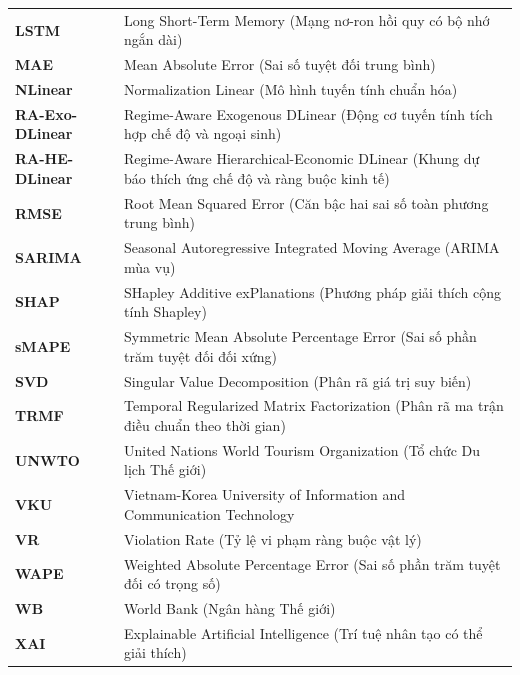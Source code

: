 \documentclass[12pt,a4paper,oneside]{report}
\begin{document}
\begin{longtable}{p{3.0cm} p{11.5cm}}
\textbf{LSTM} & Long Short-Term Memory (Mạng nơ-ron hồi quy có bộ nhớ ngắn dài) \\
\textbf{MAE} & Mean Absolute Error (Sai số tuyệt đối trung bình) \\
\textbf{NLinear} & Normalization Linear (Mô hình tuyến tính chuẩn hóa) \\
\textbf{RA-Exo-DLinear} & Regime-Aware Exogenous DLinear (Động cơ tuyến tính tích hợp chế độ và ngoại sinh) \\
\textbf{RA-HE-DLinear} & Regime-Aware Hierarchical-Economic DLinear (Khung dự báo thích ứng chế độ và ràng buộc kinh tế) \\
\textbf{RMSE} & Root Mean Squared Error (Căn bậc hai sai số toàn phương trung bình) \\
\textbf{SARIMA} & Seasonal Autoregressive Integrated Moving Average (ARIMA mùa vụ) \\
\textbf{SHAP} & SHapley Additive exPlanations (Phương pháp giải thích cộng tính Shapley) \\
\textbf{sMAPE} & Symmetric Mean Absolute Percentage Error (Sai số phần trăm tuyệt đối đối xứng) \\
\textbf{SVD} & Singular Value Decomposition (Phân rã giá trị suy biến) \\
\textbf{TRMF} & Temporal Regularized Matrix Factorization (Phân rã ma trận điều chuẩn theo thời gian) \\
\textbf{UNWTO} & United Nations World Tourism Organization (Tổ chức Du lịch Thế giới) \\
\textbf{VKU} & Vietnam-Korea University of Information and Communication Technology \\
\textbf{VR} & Violation Rate (Tỷ lệ vi phạm ràng buộc vật lý) \\
\textbf{WAPE} & Weighted Absolute Percentage Error (Sai số phần trăm tuyệt đối có trọng số) \\
\textbf{WB} & World Bank (Ngân hàng Thế giới) \\
\textbf{XAI} & Explainable Artificial Intelligence (Trí tuệ nhân tạo có thể giải thích) \\
\bottomrule
\end{longtable}
\newpage

\cleardoublepage
{} %
\end{document}
